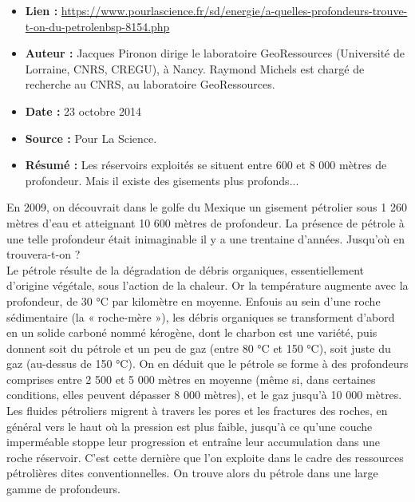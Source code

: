 \documentclass[8pt]{article}
\begin{document}
\begin{itemize}
	\item \textbf{Lien : }  \url{https://www.pourlascience.fr/sd/energie/a-quelles-profondeurs-trouve-t-on-du-petrolenbsp-8154.php} 
	\item \textbf{Auteur : } Jacques Pironon dirige le laboratoire GeoRessources (Université de Lorraine, CNRS, CREGU), à Nancy. Raymond Michels est chargé de recherche au CNRS, au laboratoire GeoRessources.	
	\item \textbf{Date : }  23 octobre 2014
	\item \textbf{Source : } Pour La Science.
	\item \textbf{Résumé : } Les réservoirs exploités se situent entre 600 et 8 000 mètres de profondeur. Mais il existe des gisements plus profonds...
	
\end{itemize}


En 2009, on découvrait dans le golfe du Mexique un gisement pétrolier sous 1 260 mètres d'eau et atteignant 10 600 mètres de profondeur. 
La présence de pétrole à une telle profondeur était inimaginable il y a une trentaine d'années.
Jusqu'où en trouvera-t-on ?\\ 

Le pétrole résulte de la dégradation de débris organiques, essentiellement d’origine
végétale, sous l’action de la chaleur. Or la température augmente avec la profondeur, de 30 °C par kilomètre en moyenne.
Enfouis au sein d’une roche sédimentaire (la
« roche-mère »), les débris organiques se
transforment d’abord en un solide carboné
nommé kérogène, dont le charbon est une
variété, puis donnent soit du pétrole et un
peu de gaz (entre 80 °C et 150 °C), soit juste
du gaz (au-dessus de 150 °C). On en déduit
que le pétrole se forme à des profondeurs
comprises entre 2 500 et 5 000 mètres en
moyenne (même si, dans certaines conditions, elles peuvent dépasser 8 000 mètres),
et le gaz jusqu’à 10 000 mètres.\\

Les fluides pétroliers migrent à travers les pores et les fractures des roches, en général vers le haut où la pression est plus faible, jusqu'à ce qu'une couche imperméable stoppe leur progression et entraîne leur accumulation dans une roche réservoir. C'est cette dernière que l'on exploite dans le cadre des ressources pétrolières dites conventionnelles. On trouve alors du pétrole dans une large gamme de profondeurs.\\
\end{document}
